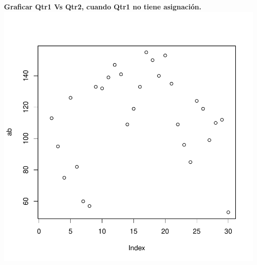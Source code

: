 \documentclass[10pt]{report}
\begin{document}
\textbf{Graficar Qtr1 Vs Qtr2, cuando Qtr1 no tiene asignación.}\\
\includegraphics{1105652190-005}
\begin{center}
\end{center}
\end{document}
